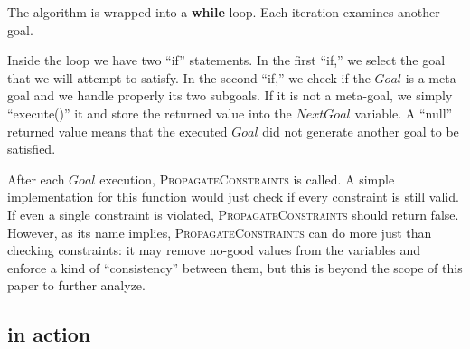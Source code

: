 \documentclass{ws-ijait}
\begin{document}
The algorithm is wrapped into a \textbf{while} loop. Each
iteration examines another goal.

Inside the loop we have two ``if'' statements. In the first
``if,'' we select the goal that we will attempt to satisfy.
In the second ``if,'' we check if the $\mathit{Goal}$ is a
meta-goal and we handle properly its two subgoals. If it is
not a meta-goal, we simply ``execute()'' it and store the
returned value into the $\mathit{NextGoal}$ variable. A
``null'' returned value means that the executed
$\mathit{Goal}$ did not generate another goal to be
satisfied.

After each $\mathit{Goal}$ execution,
\textsc{PropagateConstraints} is called. A simple
implementation for this function would just check if every
constraint is still valid. If even a single constraint is
violated, \textsc{PropagateConstraints} should return false.
However, as its name implies, \textsc{PropagateConstraints}
can do more just than checking constraints: it may remove
no-good values from the variables and enforce a kind of
``consistency'' between them, but this is beyond the scope
of this paper to further analyze.\cite{Chen2013}

\subsection{\Solve{} in action}
\end{document}
